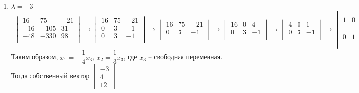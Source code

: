 \begin{enumerate}
\begin{enumerate}
			\item $\lambda = -3$\\
				\begin{gather*}
					\begin{vmatrix}
						16 & 75 & -21\\
						-16 & -105 & 31\\
						-48 & -330 & 98\\
					\end{vmatrix}
					\to
					\begin{vmatrix}
						16 & 75 & -21\\
						0 & 3 & -1\\
						0 & 3 & -1\\
					\end{vmatrix}
					\to
					\begin{vmatrix}
						16 & 75 & -21\\
						0 & 3 & -1\\
					\end{vmatrix}
					\to
					\begin{vmatrix}
						16 & 0 & 4\\
						0 & 3 & -1\\
					\end{vmatrix}
					\to
					\begin{vmatrix}
						4 & 0 & 1\\
						0 & 3 & -1\\
					\end{vmatrix}
					\to
					\begin{vmatrix}
						1 & 0 & \dfrac{1}{4}\\
						0 & 1 & -\dfrac{1}{3}\\
					\end{vmatrix} 
				\end{gather*}
				Таким образом, $x_{1} = -\dfrac{1}{4}x_{3}$, $x_{2} = \dfrac{1}{3}x_{3}$, где $x_{3}$ -- свободная переменная.\\
				Тогда собственный вектор $\begin{vmatrix} -3\\ 4\\ 12 \end{vmatrix}$ 
				

\end{enumerate}
\end{enumerate}
